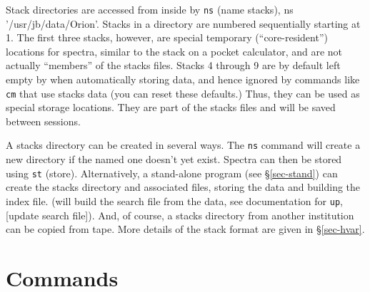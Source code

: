 Stack directories are accessed from inside \COMB by {\tt ns} (name stacks), \eg 
{\us ns '/usr/jb/data/Orion'}.
Stacks in a directory are numbered sequentially starting at 1.  The first
three stacks, however, are special temporary (``core-resident'') 
locations for spectra, similar to the stack on a pocket calculator, and are
not actually ``members'' of the stacks files.
\smallskip
{}
\smallskip
\noindent Stacks 4 through 9 are by default left empty by \COMB when automatically
storing data, and hence ignored by commands like {\tt cm} that use
stacks data (you can reset these defaults.) Thus, they 
can be used as special storage locations. They are part of the stacks 
files and will be saved between \COMB sessions.

A stacks directory can be created in several ways. The {\tt ns}
command will create a new directory if the named one doesn't yet exist.
Spectra can then be stored using {\tt st} (store).  Alternatively,
a stand-alone program (see \S \ref{sec-stand}) can create the 
stacks directory and associated files, 
storing the data and building the index file. (\COMB will build the search 
file from the data, see documentation for {\tt up}, [update search file]).
And, of course, a stacks directory from another institution can be
copied from tape.  More details of the stack format are given in \S \ref{sec-hvar}.

\section{Commands} 
\label{sec-com}
